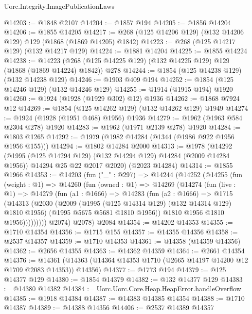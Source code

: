 \begin{lexlean}{Uorc.Integrity.ImagePublicationLaws}
\begin{coremodule}
@14203 := @1848 @2107
@14204 := @1857 @194
@14205 := @1856 @14204
@14206 := @1855 @14205
@14217 := @268 (@125 @14206 @129) (@132 @14206 @129) @129 (@1868 (@1869 @14205) @1842)
@14223 := @268 (@125 @14217 @129) (@132 @14217 @129)
@14224 := @1881 @14204
@14225 := @1855 @14224
@14238 := @14223 (@268 (@125 @14225 @129) (@132 @14225 @129) @129 (@1868 (@1869 @14224) @1842)) @278
@14244 := @1854 (@125 @14238 @129) (@132 @14238 @129)
@14246 := @1903 @409 @194
@14252 := @1854 (@125 @14246 @129) (@132 @14246 @129)
@14255 := @1914 (@1915 @194) @1920
@14260 := @1924 (@1928 (@1929 @302) @12) @1936
@14262 := @1868 @7924 @12
@14269 := @1854 (@125 @14262 @129) (@132 @14262 @129) @1949
@14274 := @1924 (@1928 (@1951 @468) @1956) @1936
@14279 := @1962 (@1963 @584 @2304 @278) @1920
@14283 := @1962 (@1971 @2139 @278) @1920
@14284 := @1803 @1265
@14292 := @1979 (@1982 @14284 (@1344 (@1986 @922 @1956 @1956 @155)))
@14294 := @1802 @14284 @2000
@14313 := @1978
    (@14292
      (@1995 (@125 @14294 @129) (@132 @14294 @129) @14284 (@2009 @14284 @1956))
      @14294
      @25
      @22
      @2017
      @2020)
    (@2023 @14284)
@14314 := @1855 @1966
@14353 := @14203
    (fun ("_" : @297) =>
    @14244
      (@14252
        (@14255
          (fun (weight : @1) =>
          @14260
            (fun (owned : @1) =>
            @14269
              (@14274
                (fun (live : @1) =>
                @14279
                  (fun (a1 : @1666) =>
                  @14283
                    (fun (a2 : @1666) =>
                    @1715
                      (@14313
                        (@2030
                          (@2009
                            (@1995 (@125 @14314 @129) (@132 @14314 @129) @1810 @1956)
                            (@1995 @5675 @5681 @1810 @1956))
                          @1810
                          @1956
                          @1810
                          @1956)))))))))
        @2074)
      @2078)
    @2084
@14354 := @14202 @14353
@14355 := @1710 @14354
@14356 := @1715 @155
@14357 := @14355 @14356
@14358 := @2537 @14357
@14359 := @1710 @14353
@14361 := @14358 (@14359 @14356)
@14362 := @2656 @14355
@14363 := @14362 @14359
@14364 := @2661 @14354
@14376 := @14361 (@14363 (@14364 @14353 @1710 (@2665 @14197 @14200 @12 @1709 @2083 @14353)) @14356)
@14377 := @1773 @194
@14379 := @125 @14377 @129
@14380 := @1854 @14379
@14382 := @132 @14377 @129
@14383 := @14380 @14382
@14384 := Uorc.Uorc.Core.Heap.HeapError.handleOverflow
@14385 := @1918 @14384
@14387 := @14383 @14385 @14354
@14388 := @1710 @14387
@14389 := @14388 @14356
@14406 := @2537
    @14389
    @14357

\end{coremodule}
\end{lexlean}

